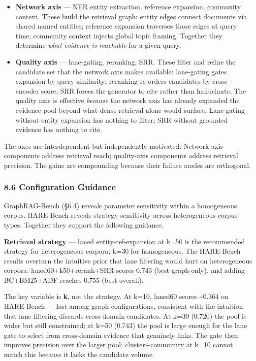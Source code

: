 \begin{itemize}
\item
  \textbf{Network axis} --- NER entity extraction, reference expansion, community context. These build the retrieval graph: entity edges connect documents via shared named entities; reference expansion traverses those edges at query time; community context injects global topic framing. Together they determine \emph{what evidence is reachable} for a given query.
\item
  \textbf{Quality axis} --- lane-gating, reranking, SRR. These filter and refine the candidate set that the network axis makes available: lane-gating gates expansion by query similarity; reranking re-orders candidates by cross-encoder score; SRR forces the generator to cite rather than hallucinate. The quality axis is effective \emph{because} the network axis has already expanded the evidence pool beyond what dense retrieval alone would surface. Lane-gating without entity expansion has nothing to filter; SRR without grounded evidence has nothing to cite.
\end{itemize}

The axes are interdependent but independently motivated. Network-axis components address retrieval reach; quality-axis components address retrieval precision. The gains are compounding because their failure modes are orthogonal.

\subsubsection{8.6 Configuration Guidance}\label{configuration-guidance}

GraphRAG-Bench (§6.4) reveals parameter sensitivity within a homogeneous corpus. HARE-Bench reveals strategy sensitivity across heterogeneous corpus types. Together they support the following guidance.

\textbf{Retrieval strategy} --- laned entity-ref-expansion at k=50 is the recommended strategy for heterogeneous corpora; k=30 for homogeneous. The HARE-Bench results overturn the intuitive prior that lane filtering would hurt on heterogeneous corpora: laned60+k50+rerank+SRR scores 0.743 (best graph-only), and adding BC+BM25+ADF reaches 0.755 (best overall).

The key variable is \textbf{k}, not the strategy. At k=10, laned60 scores \textasciitilde0.364 on HARE-Bench --- last among graph configurations, consistent with the intuition that lane filtering discards cross-domain candidates. At k=30 (0.720) the pool is wider but still constrained; at k=50 (0.743) the pool is large enough for the lane gate to select from cross-domain evidence that genuinely links. The gate then improves precision over the larger pool; cluster+community at k=10 cannot match this because it lacks the candidate volume.

